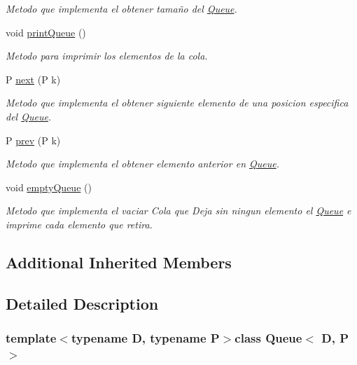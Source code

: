 \begin{DoxyCompactItemize}
\begin{DoxyCompactList}\small\item\em Metodo que implementa el obtener tamaño del \hyperlink{class_queue}{Queue}. \end{DoxyCompactList}\item 
void \hyperlink{class_queue_a5a68470adc616026ded26026bcec5a1f}{print\+Queue} ()
\begin{DoxyCompactList}\small\item\em Metodo para imprimir los elementos de la cola. \end{DoxyCompactList}\item 
P \hyperlink{class_queue_aa4c9b83f260a172e1fffc389f354386f}{next} (P k)
\begin{DoxyCompactList}\small\item\em Metodo que implementa el obtener siguiente elemento de una posicion especifica del \hyperlink{class_queue}{Queue}. \end{DoxyCompactList}\item 
P \hyperlink{class_queue_adcb9a0e709ea65bc7e98f7e9cbae8a39}{prev} (P k)
\begin{DoxyCompactList}\small\item\em Metodo que implementa el obtener elemento anterior en \hyperlink{class_queue}{Queue}. \end{DoxyCompactList}\item 
void \hyperlink{class_queue_a619e0caf9005be9ccd38e3284ad6b796}{empty\+Queue} ()
\begin{DoxyCompactList}\small\item\em Metodo que implementa el vaciar Cola que Deja sin ningun elemento el \hyperlink{class_queue}{Queue} e imprime cada elemento que retira. \end{DoxyCompactList}\end{DoxyCompactItemize}
\subsection*{Additional Inherited Members}


\subsection{Detailed Description}
\subsubsection*{template$<$typename D, typename P$>$class Queue$<$ D, P $>$}

